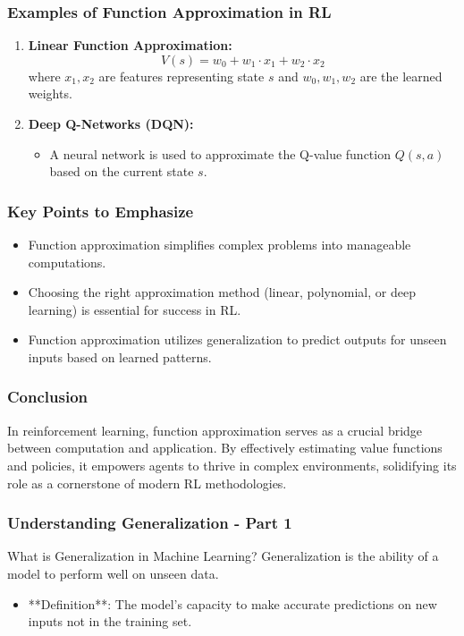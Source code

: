 \documentclass[aspectratio=169]{beamer}
\begin{document}
\begin{frame}[fragile]
    \frametitle{Examples of Function Approximation in RL}
    \begin{enumerate}
        \item \textbf{Linear Function Approximation:}
            \begin{equation}
                V(s) = w_0 + w_1 \cdot x_1 + w_2 \cdot x_2
            \end{equation}
            where \( x_1, x_2 \) are features representing state \( s \) and \( w_0, w_1, w_2 \) are the learned weights.
        
        \item \textbf{Deep Q-Networks (DQN):}
            \begin{itemize}
                \item A neural network is used to approximate the Q-value function \( Q(s, a) \) based on the current state \( s \).
            \end{itemize}
    \end{enumerate}
\end{frame}

\begin{frame}[fragile]
    \frametitle{Key Points to Emphasize}
    \begin{itemize}
        \item Function approximation simplifies complex problems into manageable computations.
        \item Choosing the right approximation method (linear, polynomial, or deep learning) is essential for success in RL.
        \item Function approximation utilizes generalization to predict outputs for unseen inputs based on learned patterns.
    \end{itemize}
\end{frame}

\begin{frame}[fragile]
    \frametitle{Conclusion}
    In reinforcement learning, function approximation serves as a crucial bridge between computation and application. By effectively estimating value functions and policies, it empowers agents to thrive in complex environments, solidifying its role as a cornerstone of modern RL methodologies.
\end{frame}

\begin{frame}[fragile]
    \frametitle{Understanding Generalization - Part 1}
    \begin{block}{What is Generalization in Machine Learning?}
        Generalization is the ability of a model to perform well on unseen data.
    \end{block}
    
    \begin{itemize}
        \item **Definition**: The model's capacity to make accurate predictions on new inputs not in the training set.
    \end{itemize}
\end{frame}
\end{document}
